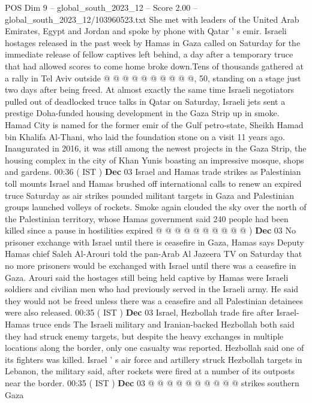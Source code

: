 \begin{textsample}{POS Dim 9 – global\_south\_2023\_12 – Score 2.00 – global\_south\_2023\_12/103960523.txt}
She met with leaders of the United Arab Emirates, Egypt and Jordan and spoke by phone with Qatar ' s emir.
Israeli hostages released in the past week by Hamas in Gaza called on Saturday for the immediate release of fellow captives left behind, a day after a temporary truce that had allowed scores to come home broke down.Tens of thousands gathered at a rally in Tel Aviv outside @ @ @ @ @ @ @ @ @ @, 50, standing on a stage just two days after being freed.
At almost exactly the same time Israeli negotiators pulled out of deadlocked truce talks in Qatar on Saturday, Israeli jets sent a prestige Doha-funded housing development in the Gaza Strip up in smoke.
Hamad City is named for the former emir of the Gulf petro-state, Sheikh Hamad bin Khalifa Al-Thani, who laid the foundation stone on a visit 11 years ago.
Inaugurated in 2016, it was still among the newest projects in the Gaza Strip, the housing complex in the city of Khan Yunis boasting an impressive mosque, shops and gardens. 00:36 ( IST ) \textbf{Dec} 03 Israel and Hamas trade strikes as Palestinian toll mounts Israel and Hamas brushed off international calls to renew an expired truce Saturday as air strikes pounded militant targets in Gaza and Palestinian groups launched volleys of rockets.
Smoke again clouded the sky over the north of the Palestinian territory, whose Hamas government said 240 people had been killed since a pause in hostilities expired @ @ @ @ @ @ @ @ @ @ ) \textbf{Dec} 03 No prisoner exchange with Israel until there is ceasefire in Gaza, Hamas says Deputy Hamas chief Saleh Al-Arouri told the pan-Arab Al Jazeera TV on Saturday that no more prisoners would be exchanged with Israel until there was a ceasefire in Gaza.
Arouri said the hostages still being held captive by Hamas were Israeli soldiers and civilian men who had previously served in the Israeli army.
He said they would not be freed unless there was a ceasefire and all Palestinian detainees were also released. 00:35 ( IST ) \textbf{Dec} 03 Israel, Hezbollah trade fire after Israel-Hamas truce ends The Israeli military and Iranian-backed Hezbollah both said they had struck enemy targets, but despite the heavy exchanges in multiple locations along the border, only one casualty was reported.
Hezbollah said one of its fighters was killed.
Israel ' s air force and artillery struck Hezbollah targets in Lebanon, the military said, after rockets were fired at a number of its outposts near the border. 00:35 ( IST ) \textbf{Dec} 03 @ @ @ @ @ @ @ @ @ @ strikes southern Gaza

\end{textsample}
